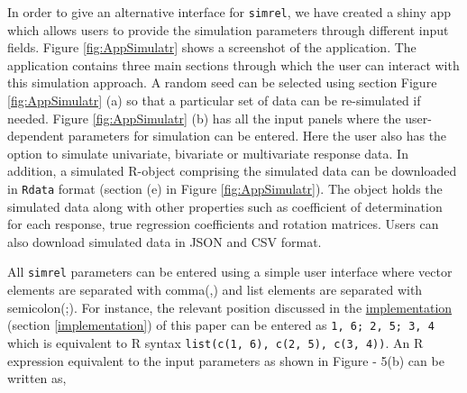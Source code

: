 \documentclass[review]{elsarticle}
\theoremstyle{definition}
\theoremstyle{definition}
\theoremstyle{definition}
\theoremstyle{remark}
\begin{document}
In order to give an alternative interface for \texttt{simrel}, we have
created a shiny app which allows users to provide the simulation
parameters through different input fields. Figure \ref{fig:AppSimulatr}
shows a screenshot of the application. The application contains three
main sections through which the user can interact with this simulation
approach. A random seed can be selected using section Figure
\ref{fig:AppSimulatr} (a) so that a particular set of data can be
re-simulated if needed. Figure \ref{fig:AppSimulatr} (b) has all the
input panels where the user-dependent parameters for simulation can be
entered. Here the user also has the option to simulate univariate,
bivariate or multivariate response data. In addition, a simulated
R-object comprising the simulated data can be downloaded in
\texttt{Rdata} format (section (e) in Figure \ref{fig:AppSimulatr}). The
object holds the simulated data along with other properties such as
coefficient of determination for each response, true regression
coefficients and rotation matrices. Users can also download simulated
data in JSON and CSV format.

All \texttt{simrel} parameters can be entered using a simple user
interface where vector elements are separated with comma(,) and list
elements are separated with semicolon(;). For instance, the relevant
position discussed in the
\protect\hyperlink{implementation}{implementation} (section
\ref{implementation}) of this paper can be entered as
\texttt{1,\ 6;\ 2,\ 5;\ 3,\ 4} which is equivalent to R syntax
\texttt{list(c(1,\ 6),\ c(2,\ 5),\ c(3,\ 4))}. An R expression
equivalent to the input parameters as shown in Figure - 5(b) can be
written as,
\end{document}
